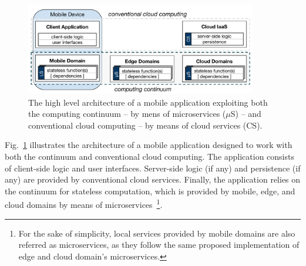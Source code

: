 \begin{figure}[tbp]
	\includegraphics[width=0.9\textwidth]{figs/Continuum-arch}
	\caption{The high level architecture of a mobile application exploiting both the computing continuum -- by mens of microservices ($\mu$S) -- and conventional cloud computing -- by means of cloud services (CS).}
	\label{fig:Continuum-arch}
\end{figure}



Fig.~\ref{fig:Continuum-arch} illustrates the architecture of a mobile application designed to work with both the continuum and conventional cloud computing. The application consists of 
client-side logic and user interfaces. Server-side logic (if any) and persistence (if any) are provided by conventional cloud services. Finally, the application relies on the continuum for stateless computation, which is provided by mobile, edge, and cloud domains by means of microservices~\footnote{For the sake of simplicity, local services provided by mobile domains are also referred as microservices, as they follow the same proposed implementation of edge and cloud domain's microservices.}. 




